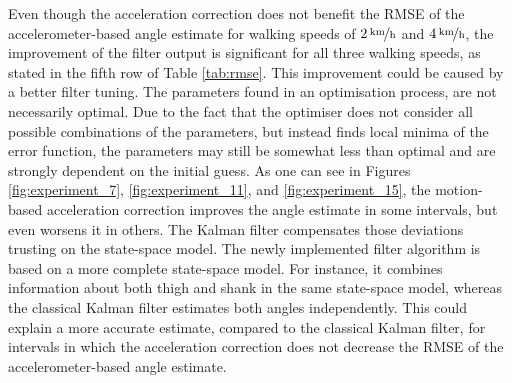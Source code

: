  Even though the acceleration correction does not benefit the RMSE of the accelerometer-based angle estimate for walking speeds of $\unitfrac[2]{km}{h}$ and $\unitfrac[4]{km}{h}$, the improvement of the filter output is significant for all three walking speeds, as stated in the fifth row of Table \ref{tab:rmse}. This improvement could be caused by a better filter tuning. The parameters found in an optimisation process, are not necessarily optimal. Due to the fact that the optimiser does not consider all possible combinations of the parameters, but instead finds local minima of the error function, the parameters may still be somewhat less than optimal and are strongly dependent on the initial guess. As one can see in Figures \ref{fig:experiment_7}, \ref{fig:experiment_11}, and \ref{fig:experiment_15}, the motion-based acceleration correction improves the angle estimate in some intervals, but even worsens it in others. The Kalman filter compensates those deviations trusting on the state-space model. The newly implemented filter algorithm is based on a more complete state-space model. For instance, it combines information about both thigh and shank in the same state-space model, whereas the classical Kalman filter estimates both angles independently. This could explain a more accurate estimate, compared to the classical Kalman filter, for intervals in which the acceleration correction does not decrease the RMSE of the accelerometer-based angle estimate.
